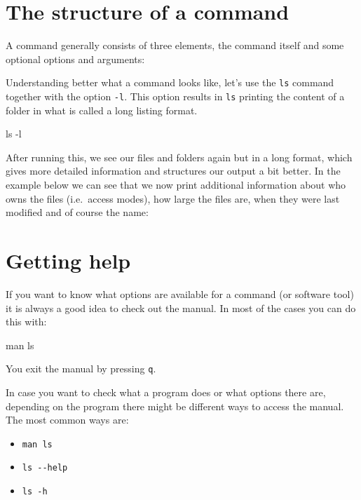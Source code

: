 \documentclass[
  letterpaper,
  DIV=11,
  numbers=noendperiod]{scrreprt}
\newenvironment{Shaded}{}{}
\newcommand{\AttributeTok}[1]{\textcolor[rgb]{0.84,0.23,0.29}{#1}}
\newcommand{\FunctionTok}[1]{\textcolor[rgb]{0.44,0.26,0.76}{#1}}
\newcommand{\NormalTok}[1]{\textcolor[rgb]{0.14,0.16,0.18}{#1}}
\providecommand{\tightlist}{%
  \setlength{\itemsep}{0pt}\setlength{\parskip}{0pt}}\usepackage{longtable,booktabs,array}
\begin{document}
\section{The structure of a command}\label{the-structure-of-a-command}

A command generally consists of three elements, the command itself and
some optional options and arguments:

Understanding better what a command looks like, let's use the
\texttt{ls} command together with the option \texttt{-l}. This option
results in \texttt{ls} printing the content of a folder in what is
called a long listing format.

\begin{Shaded}
\begin{Highlighting}[]
\FunctionTok{ls} \AttributeTok{{-}l}
\end{Highlighting}
\end{Shaded}

After running this, we see our files and folders again but in a long
format, which gives more detailed information and structures our output
a bit better. In the example below we can see that we now print
additional information about who owns the files (i.e.~access modes), how
large the files are, when they were last modified and of course the
name:

\section{Getting help}\label{getting-help}

If you want to know what options are available for a command (or
software tool) it is always a good idea to check out the manual. In most
of the cases you can do this with:

\begin{Shaded}
\begin{Highlighting}[]
\FunctionTok{man}\NormalTok{ ls}
\end{Highlighting}
\end{Shaded}

You exit the manual by pressing \texttt{q}.

In case you want to check what a program does or what options there are,
depending on the program there might be different ways to access the
manual. The most common ways are:

\begin{itemize}
\tightlist
\item
  \texttt{man\ ls}
\item
  \texttt{ls\ -\/-help}
\item
  \texttt{ls\ -h}
\end{itemize}
\end{document}
